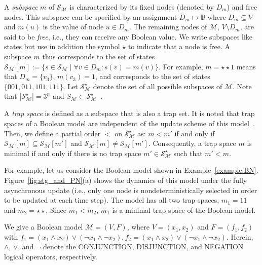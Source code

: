\documentclass[runningheads]{llncs}
\begin{document}
A \emph{subspace} \(m\) of \(\mathcal{S}_{\mathcal{M}}\) is characterized by its fixed nodes (denoted by \(D_m\)) and free nodes.
This subspace can be specified by an assignment \(D_m \mapsto \mathbb{B}\) where \(D_m \subseteq V\) and \(m(u)\) is the value of node \(u \in D_m\).
The remaining nodes of \(\mathcal{M}\), \(V \setminus D_m\), are said to be \emph{free}, i.e., they can receive any Boolean value.
We write subspaces like states but use in addition the symbol \(\star\) to indicate that a node is free.
A subspace \(m\) thus corresponds to the set of states \(\mathcal{S}_{\mathcal{M}}[m] := \{s \in \mathcal{S}_{\mathcal{M}}\;|\;\forall v \in D_m : s(v) = m(v)\}\).
For example, \(m = \star\star1\) means that \(D_m = \{v_3\}\), \(m(v_3) = 1\), and corresponds to the set of states \(\{001, 011, 101, 111\}\).
Let \(\mathcal{S}_{\mathcal{M}}^{\star}\) denote the set of all possible subspaces of \(\mathcal{M}\). Note that \(\left|\mathcal{S}_{\mathcal{M}}^{\star}\right| = 3^n\) and \(S_{\mathcal{M}} \subset \mathcal{S}_{\mathcal{M}}^{\star}\)~\cite{klarner2015computing}.

A \emph{trap space} is defined as a subspace that is also a trap set.
It is noted that trap spaces of a Boolean model are independent of the update scheme of this model~\cite{klarner2015computing}.
Then, we define a partial order \(<\) on \(\mathcal{S}_{\mathcal{M}}^{\star}\) as: \(m < m'\) if and only if \(\mathcal{S}_{\mathcal{M}}[m] \subseteq \mathcal{S}_{\mathcal{M}}[m']\) and \(\mathcal{S}_{\mathcal{M}}[m] \neq \mathcal{S}_{\mathcal{M}}[m']\).
Consequently, a trap space \(m\) is minimal if and only if there is no trap space \(m' \in \mathcal{S}_{\mathcal{M}}^{\star}\) such that \(m' < m\).

For example, let us consider the Boolean model shown in Example~\ref{example:BN}.
Figure~\ref{fig:stg_and_PN}(a) shows the dynamics of this model under the fully asynchronous update (i.e., only one node is nondeterministically selected in order to be updated at each time step).
The model has all two trap spaces, \(m_1 = 11\) and \(m_2 = \star\star\).
Since \(m_1 < m_2\), \(m_1\) is a minimal trap space of the Boolean model.

\begin{example}
We give a Boolean model \(\mathcal{M} = (V, F)\), where \(V = (x_1, x_2)\) and \(F = (f_1, f_2)\) with \(f_1 = (x_1 \land x_2) \lor (\neg x_1 \land \neg x_2), f_2 = (x_1 \land x_2) \lor (\neg x_1 \land \neg x_2)\). Herein, \(\land\), \(\lor\), and \(\neg\) denote the CONJUNCTION, DISJUNCTION, and NEGATION logical operators, respectively.
\label{example:BN}
\end{example}
\end{document}
